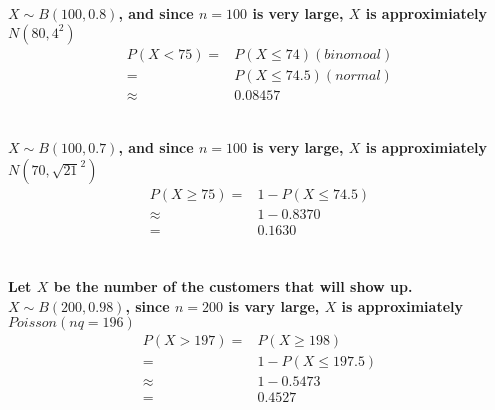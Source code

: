 \documentclass{article}
\begin{document}
    \section{}
        \subsection{}
            \paragraph{
                $X\sim B(100,0.8)$, and since $n=100$ is very large, $X$ is approximiately $N(80,4^2)$
                \begin{equation*}
                    \begin{split}
                        P(X< 75)=&P(X\leq 74)(binomoal)\\
                            =&P(X\leq 74.5)(normal)\\
                            \approx&0.08457\\
                    \end{split}
                \end{equation*}
            }
        \subsection{}
            \paragraph{
                $X\sim B(100,0.7)$, and since $n=100$ is very large, $X$ is approximiately $N(70,\sqrt{21}^2)$
                \begin{equation*}
                    \begin{split}
                        P(X\geq75)=&1-P(X\leq 74.5)\\
                            \approx&1-0.8370\\
                            =&0.1630
                    \end{split}
                \end{equation*}
            }
    \section{}
        \paragraph{
            Let $X$ be the number of the customers that will show up. $X\sim B(200,0.98)$, since $n=200$ is vary large, $X$ is approximiately $Poisson(nq=196)$
            \begin{equation*}
                \begin{split}
                    P(X>197)=&P(X\geq 198)\\
                        =&1-P(X\leq 197.5)\\
                        \approx&1-0.5473\\
                        =&0.4527\\
                \end{split}
            \end{equation*}
        }
\end{document}
